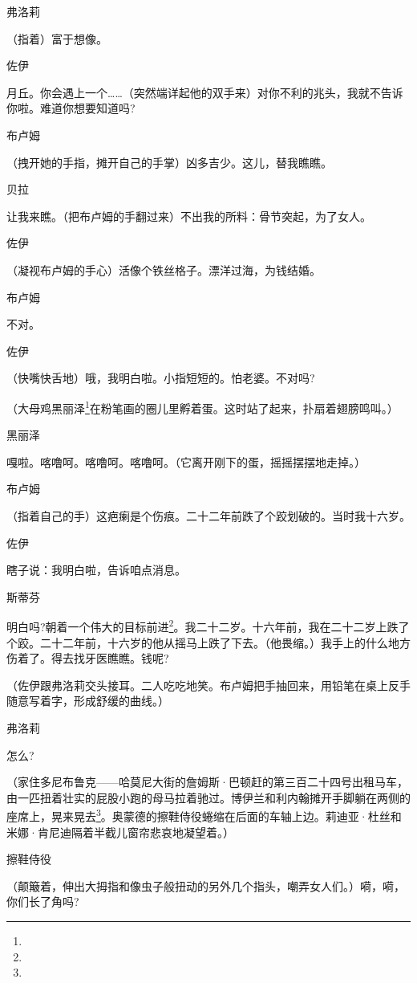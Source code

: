 \par 弗洛莉
\par （指着）富于想像。
\par 佐伊
\par 月丘。你会遇上一个……（突然端详起他的双手来）对你不利的兆头，我就不告诉你啦。难道你想要知道吗?
\par 布卢姆
\par （拽开她的手指，摊开自己的手掌）凶多吉少。这儿，替我瞧瞧。
\par 贝拉
\par 让我来瞧。（把布卢姆的手翻过来）不出我的所料：骨节突起，为了女人。
\par 佐伊
\par （凝视布卢姆的手心）活像个铁丝格子。漂洋过海，为钱结婚。
\par 布卢姆
\par 不对。
\par 佐伊
\par （快嘴快舌地）哦，我明白啦。小指短短的。怕老婆。不对吗?
\par （大母鸡黑丽泽\footnote{}在粉笔画的圈儿里孵着蛋。这时站了起来，扑扇着翅膀鸣叫。）
\par 黑丽泽
\par 嘎啦。喀噜呵。喀噜呵。喀噜呵。（它离开刚下的蛋，摇摇摆摆地走掉。）
\par 布卢姆
\par （指着自己的手）这疤瘌是个伤痕。二十二年前跌了个跤划破的。当时我十六岁。
\par 佐伊
\par 瞎子说：我明白啦，告诉咱点消息。
\par 斯蒂芬
\par 明白吗?朝着一个伟大的目标前进\footnote{}。我二十二岁。十六年前，我在二十二岁上跌了个跤。二十二年前，十六岁的他从摇马上跌了下去。（他畏缩。）我手上的什么地方伤着了。得去找牙医瞧瞧。钱呢?
\par （佐伊跟弗洛莉交头接耳。二人吃吃地笑。布卢姆把手抽回来，用铅笔在桌上反手随意写着字，形成舒缓的曲线。）
\par 弗洛莉
\par 怎么?
\par （家住多尼布鲁克——哈莫尼大街的詹姆斯·巴顿赶的第三百二十四号出租马车，由一匹扭着壮实的屁股小跑的母马拉着驰过。博伊兰和利内翰摊开手脚躺在两侧的座席上，晃来晃去\footnote{}。奥蒙德的擦鞋侍役蜷缩在后面的车轴上边。莉迪亚·杜丝和米娜·肯尼迪隔着半截儿窗帘悲哀地凝望着。）
\par 擦鞋侍役
\par （颠簸着，伸出大拇指和像虫子般扭动的另外几个指头，嘲弄女人们。）嗬，嗬，你们长了角吗?
